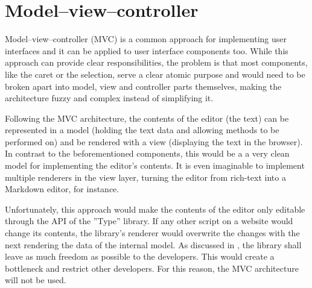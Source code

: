 

\section{Model--view--controller}

Model--view--controller (MVC) is a common approach for implementing user interfaces and it can be applied to user interface components too. While this approach can provide clear responsibilities, the problem is that most components, like the caret or the selection, serve a clear atomic purpose and would need to be broken apart into model, view and controller parts themselves, making the architecture fuzzy and complex instead of simplifying it.

Following the MVC architecture, the contents of the editor (the text) can be represented in a model (holding the text data and allowing methods to be performed on) and be rendered with a view (displaying the text in the browser). In contrast to the beforementioned components, this would be a a very clean model for implementing the editor's contents. It is even imaginable to implement multiple renderers in the view layer, turning the editor from rich-text into a Markdown editor, for instance.

Unfortunately, this approach would make the contents of the editor only editable through the API of the ''Type'' library. If any other script on a website would change its contents, the library's renderer would overwrite the changes with the next rendering the data of the internal model. As discussed in , the library shall leave as much freedom as possible to the developers. This would create a bottleneck and restrict other developers. For this reason, the MVC architecture will not be used.

